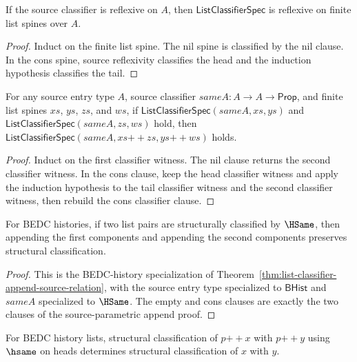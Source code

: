 \begin{theorem}
\label{thm:list-classifier-reflexivity}
If the source classifier is reflexive on $A$, then $\mathsf{ListClassifierSpec}$ is reflexive on finite list spines over $A$.
\end{theorem}
\begin{proof}
Induct on the finite list spine. The nil spine is classified by the nil clause. In the cons spine, source reflexivity classifies the head and the induction hypothesis classifies the tail.
\end{proof}

\begin{theorem}
\label{thm:list-classifier-append-source-relation}
For any source entry type $A$, source classifier $sameA:A\to A\to\mathsf{Prop}$,
and finite list spines $xs$, $ys$, $zs$, and $ws$, if
$\mathsf{ListClassifierSpec}(sameA,xs,ys)$ and
$\mathsf{ListClassifierSpec}(sameA,zs,ws)$ hold, then
$\mathsf{ListClassifierSpec}(sameA,xs{++}zs,ys{++}ws)$ holds.
\end{theorem}
\begin{proof}
Induct on the first classifier witness. The nil clause returns the second
classifier witness. In the cons clause, keep the head classifier witness and
apply the induction hypothesis to the tail classifier witness and the second
classifier witness, then rebuild the cons classifier clause.
\end{proof}

\begin{theorem}
\label{thm:list-classifier-append-hsame}
For BEDC histories, if two list pairs are structurally classified by \(\HSame\),
then appending the first components and appending the second components
preserves structural classification.
\end{theorem}

\begin{proof}
This is the BEDC-history specialization of
Theorem~\ref{thm:list-classifier-append-source-relation}, with the source
entry type specialized to $\mathsf{BHist}$ and $sameA$ specialized to
$\HSame$. The empty and cons clauses are exactly the two clauses of the
source-parametric append proof.
\end{proof}

\begin{theorem}
\label{thm:list-classifier-hsame-append-left-cancel}
For BEDC history lists, structural classification of \(p{++}x\) with
\(p{++}y\) using \(\hsame\) on heads determines structural classification of
\(x\) with \(y\).
\end{theorem}

